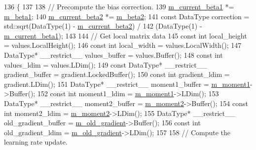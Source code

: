 \begin{DoxyCode}
136                                                                   \{
137 
138   \textcolor{comment}{// Precompute the bias correction.}
139   \hyperlink{classlbann_1_1hypergradient__adam_a671c622860c712ef9716c2c8c6714780}{m\_current\_beta1} *= \hyperlink{classlbann_1_1hypergradient__adam_a876a8bc1ee9a47479008d204048724e7}{m\_beta1};
140   \hyperlink{classlbann_1_1hypergradient__adam_a2d8b00faecbf4ce3996f879566ca4064}{m\_current\_beta2} *= \hyperlink{classlbann_1_1hypergradient__adam_a0effe7359fa37f02a40f059281580760}{m\_beta2};
141   \textcolor{keyword}{const} DataType correction = std::sqrt(DataType(1) - \hyperlink{classlbann_1_1hypergradient__adam_a2d8b00faecbf4ce3996f879566ca4064}{m\_current\_beta2}) /
142                               (DataType(1) - \hyperlink{classlbann_1_1hypergradient__adam_a671c622860c712ef9716c2c8c6714780}{m\_current\_beta1});
143 
144   \textcolor{comment}{// Get local matrix data}
145   \textcolor{keyword}{const} \textcolor{keywordtype}{int} local\_height = values.LocalHeight();
146   \textcolor{keyword}{const} \textcolor{keywordtype}{int} local\_width = values.LocalWidth();
147   DataType* \_\_restrict\_\_ values\_buffer = values.Buffer();
148   \textcolor{keyword}{const} \textcolor{keywordtype}{int} values\_ldim = values.LDim();
149   \textcolor{keyword}{const} DataType* \_\_restrict\_\_ gradient\_buffer = gradient.LockedBuffer();
150   \textcolor{keyword}{const} \textcolor{keywordtype}{int} gradient\_ldim = gradient.LDim();
151   DataType* \_\_restrict\_\_ moment1\_buffer = \hyperlink{classlbann_1_1hypergradient__adam_a529f3b53732247ebfb649f55f1fae4d6}{m\_moment1}->Buffer();
152   \textcolor{keyword}{const} \textcolor{keywordtype}{int} moment1\_ldim = \hyperlink{classlbann_1_1hypergradient__adam_a529f3b53732247ebfb649f55f1fae4d6}{m\_moment1}->LDim();
153   DataType* \_\_restrict\_\_ moment2\_buffer = \hyperlink{classlbann_1_1hypergradient__adam_a73b77fb79bd8e9bbfc8f360197899d18}{m\_moment2}->Buffer();
154   \textcolor{keyword}{const} \textcolor{keywordtype}{int} moment2\_ldim = \hyperlink{classlbann_1_1hypergradient__adam_a73b77fb79bd8e9bbfc8f360197899d18}{m\_moment2}->LDim();
155   DataType* \_\_restrict\_\_ old\_gradient\_buffer = \hyperlink{classlbann_1_1hypergradient__adam_a2e52355f77edf55bdac8a3eed79f44c4}{m\_old\_gradient}->Buffer();
156   \textcolor{keyword}{const} \textcolor{keywordtype}{int} old\_gradient\_ldim = \hyperlink{classlbann_1_1hypergradient__adam_a2e52355f77edf55bdac8a3eed79f44c4}{m\_old\_gradient}->LDim();
157 
158   \textcolor{comment}{// Compute the learning rate update.}

\end{DoxyCode}
